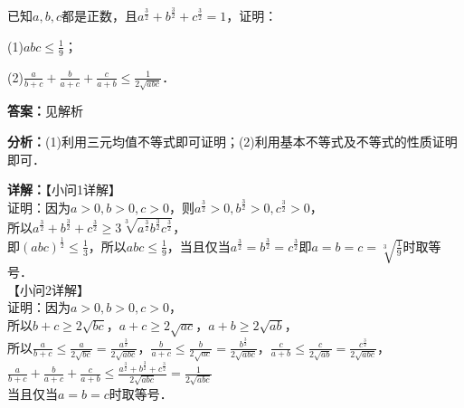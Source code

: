 \begin{question}[points=10]
[选修4-5：不等式选讲]

已知$a,b,c$都是正数，且$a^{\frac{3}{2}}+b^{\frac{3}{2}}+c^{\frac{3}{2}}=1$，证明：

(1)$abc\leq\frac{1}{9}$；

(2)$\frac{a}{b+c}+\frac{b}{a+c}+\frac{c}{a+b}\leq\frac{1}{2\sqrt{abc}}$．
\begin{solution}
\textbf{答案：}见解析

\textbf{分析：}(1)利用三元均值不等式即可证明；(2)利用基本不等式及不等式的性质证明即可．

\textbf{详解：}【小问1详解】\\证明：因为$a>0,b>0,c>0$，则$a^{\frac{3}{2}}>0,b^{\frac{3}{2}}>0,c^{\frac{3}{2}}>0$，\\所以$a^{\frac{3}{2}}+b^{\frac{3}{2}}+c^{\frac{3}{2}}\geq 3\sqrt[3]{a^{\frac{3}{2}}b^{\frac{3}{2}}c^{\frac{3}{2}}}$，\\即$(abc)^{\frac{1}{2}}\leq\frac{1}{3}$，所以$abc\leq\frac{1}{9}$，当且仅当$a^{\frac{3}{2}}=b^{\frac{3}{2}}=c^{\frac{3}{2}}$即$a=b=c=\sqrt[3]{\frac{1}{9}}$时取等号．\\【小问2详解】\\证明：因为$a>0,b>0,c>0$，\\所以$b+c\geq 2\sqrt{bc}$，$a+c\geq 2\sqrt{ac}$，$a+b\geq 2\sqrt{ab}$，\\所以$\frac{a}{b+c}\leq\frac{a}{2\sqrt{bc}}=\frac{a^{\frac{3}{2}}}{2\sqrt{abc}}$，$\frac{b}{a+c}\leq\frac{b}{2\sqrt{ac}}=\frac{b^{\frac{3}{2}}}{2\sqrt{abc}}$，$\frac{c}{a+b}\leq\frac{c}{2\sqrt{ab}}=\frac{c^{\frac{3}{2}}}{2\sqrt{abc}}$，\\$\frac{a}{b+c}+\frac{b}{a+c}+\frac{c}{a+b}\leq\frac{a^{\frac{3}{2}}+b^{\frac{3}{2}}+c^{\frac{3}{2}}}{2\sqrt{abc}}=\frac{1}{2\sqrt{abc}}$\\当且仅当$a=b=c$时取等号．
\end{solution}
\end{question}

